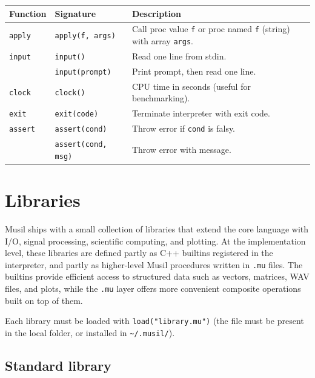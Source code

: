 \documentclass[11pt,a4paper]{article}
\newcommand{\musil}[1]{\lstinline[style=musilinline]{#1}}
\begin{document}
\begin{longtable}{@{}L{3.2cm}L{4.5cm}L{6.8cm}@{}}
\toprule
\textbf{Function} & \textbf{Signature} & \textbf{Description} \\
\midrule
\endhead
\texttt{apply}   & \texttt{apply(f, args)}      & Call proc value \texttt{f} or proc named \texttt{f} (string) with array \texttt{args}. \\
\texttt{input}   & \texttt{input()}             & Read one line from stdin. \\
                 & \texttt{input(prompt)}       & Print prompt, then read one line. \\
\texttt{clock}   & \texttt{clock()}             & CPU time in seconds (useful for benchmarking). \\
\texttt{exit}    & \texttt{exit(code)}          & Terminate interpreter with exit code. \\
\texttt{assert}  & \texttt{assert(cond)}        & Throw error if \texttt{cond} is falsy. \\
                 & \texttt{assert(cond, msg)}   & Throw error with message. \\
\bottomrule
\end{longtable}

\section{Libraries}
\label{sec:stdlib}


Musil ships with a small collection of libraries that extend the core language with I/O, signal processing, scientific computing, and plotting. At the implementation level, these libraries are defined partly as C++ builtins registered in the interpreter, and partly as higher-level Musil procedures written in \texttt{.mu} files. The builtins provide efficient access to structured data such as vectors, matrices, WAV files, and plots, while the \texttt{.mu} layer offers more convenient composite operations built on top of them. 

Each library must be loaded with \musil{load("library.mu")} (the
file must be present in the local folder, or installed in \texttt{\textasciitilde/.musil/}).

\subsection{Standard library}
\end{document}
